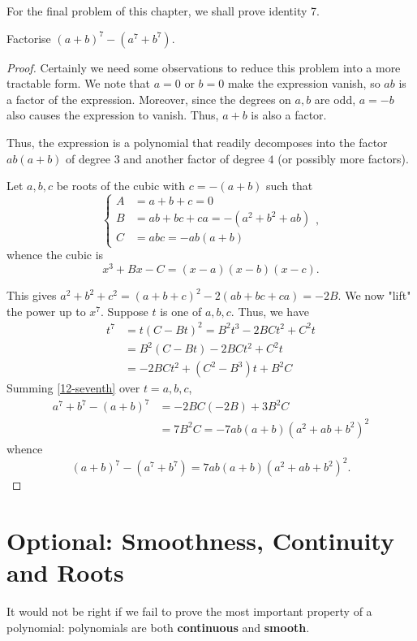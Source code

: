 \documentclass[../jarvis.tex]{subfiles}
\begin{document}
For the final problem of this chapter, we shall prove identity 7.
\begin{example}[Classic]
    Factorise $(a+b)^7-(a^7+b^7)$.
\end{example}
\begin{proof}
    Certainly we need some observations to reduce this problem into a more tractable form. We note that $a=0$ or $b=0$ make the expression vanish, so $ab$ is a factor of the expression. Moreover, since the degrees on $a, b$ are odd, $a=-b$ also causes the expression to vanish. Thus, $a+b$ is also a factor.

    Thus, the expression is a polynomial that readily decomposes into the factor $ab(a+b)$ of degree $3$ and another factor of degree $4$ (or possibly more factors).

    Let $a,b,c$ be roots of the cubic with $c=-(a+b)$ such that
    $$\begin{cases}
        A&=a+b+c=0 \\
        B&=ab+bc+ca=-(a^2+b^2+ab) \\
        C&=abc=-ab(a+b)
    \end{cases},$$
    whence the cubic is $$x^3+Bx-C=(x-a)(x-b)(x-c).$$
    
    This gives $a^2+b^2+c^2=(a+b+c)^2-2(ab+bc+ca)=-2B$. We now "lift" the power up to $x^7$. Suppose $t$ is one of $a,b,c$. Thus, we have
    \begin{align}
        t^7&=t(C-Bt)^2=B^2t^3-2BCt^2+C^2t \\
        &=B^2(C-Bt)-2BCt^2+C^2t \\
        &=-2BCt^2+(C^2-B^3)t+B^2C \label{12-seventh}
    \end{align}
    Summing \eqref{12-seventh} over $t=a,b,c$,
    \begin{align*}
        a^7+b^7-(a+b)^7&=-2BC(-2B)+3B^2C\\
        &=7B^2C=-7ab(a+b)(a^2+ab+b^2)^2
    \end{align*}
    whence $$(a+b)^7-(a^7+b^7)=7ab(a+b)(a^2+ab+b^2)^2.$$
\end{proof}

\section{Optional: Smoothness, Continuity and Roots \med}
It would not be right if we fail to prove the most important property of a polynomial: polynomials are both \textbf{continuous} and \textbf{smooth}.
\end{document}
